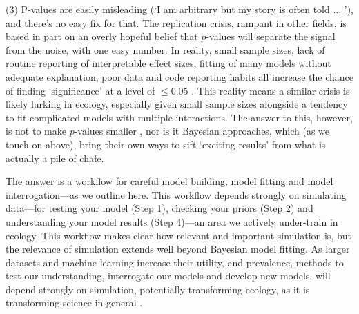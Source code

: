 \documentclass[11pt]{article}
\begin{document}
{(3) P-values are easily misleading (\href{https://www.youtube.com/watch?v=c3hxhv0lpI0}{`I am arbitrary but my story is often told ... '}), and there's no easy fix for that. The replication crisis, rampant in other fields, is based in part on an overly hopeful belief that $p$-values will separate the signal from the noise, with one easy number. In reality, small sample sizes, lack of routine reporting of interpretable effect sizes, fitting of many models without adequate explanation, poor data and code reporting habits all increase the chance of finding `significance' at a level of $\le0.05$ \citep{halsey2015,loken2017}. This reality means a similar crisis is likely lurking in ecology, especially given small sample sizes alongside a tendency to fit complicated models with multiple interactions. The answer to this, however, is not to make $p$-values smaller \citep{halsey2015,colquhoun2017}, nor is it Bayesian approaches, which (as we touch on above), bring their own ways to sift `exciting results' from what is actually a pile of chafe. 

The answer is a workflow for careful model building, model fitting and model interrogation---as we outline here. %
This workflow depends strongly on simulating data---for testing your model (Step 1), checking your priors (Step 2) and understanding your model results (Step 4)---an area we actively under-train in ecology. This workflow makes clear how relevant and important simulation is, but the relevance of simulation extends well beyond Bayesian model fitting. As larger datasets and machine learning increase their utility, and prevalence, methods to test our understanding, interrogate our models and develop new models, will depend strongly on simulation, potentially transforming ecology, as it is transforming science in general \citep{flynn2022digitaltwin,kuntz2022,oren2017}.

}
\end{document}
